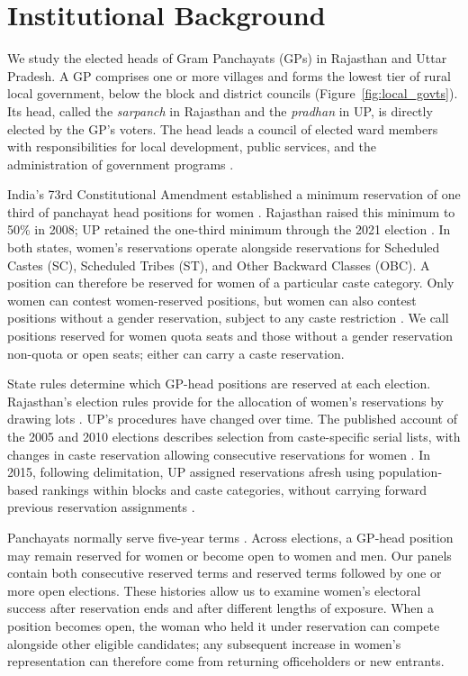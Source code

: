 \documentclass[11pt]{article}
\begin{document}
\section{Institutional Background}\label{sec:background}

We study the elected heads of Gram Panchayats (GPs) in Rajasthan and Uttar Pradesh. A GP comprises one or more villages and forms the lowest tier of rural local government, below the block and district councils (Figure~\ref{fig:local_govts}). Its head, called the \textit{sarpanch} in Rajasthan and the \textit{pradhan} in UP, is directly elected by the GP's voters. The head leads a council of elected ward members with responsibilities for local development, public services, and the administration of government programs \citep{rajasthan1994act, up1947act}.

India's 73rd Constitutional Amendment established a minimum reservation of one third of panchayat head positions for women \citep[Article 243D(4)]{indiaConstitution}. Rajasthan raised this minimum to 50\% in 2008; UP retained the one-third minimum through the 2021 election \citep{mopr2021reservation}. In both states, women's reservations operate alongside reservations for Scheduled Castes (SC), Scheduled Tribes (ST), and Other Backward Classes (OBC). A position can therefore be reserved for women of a particular caste category. Only women can contest women-reserved positions, but women can also contest positions without a gender reservation, subject to any caste restriction \citep{rajasthan1994act, up1947act}. We call positions reserved for women quota seats and those without a gender reservation non-quota or open seats; either can carry a caste reservation.

State rules determine which GP-head positions are reserved at each election. Rajasthan's election rules provide for the allocation of women's reservations by drawing lots \citep[Rule 9(3)]{rajasthan1994electionrules}. UP's procedures have changed over time. The published account of the 2005 and 2010 elections describes selection from caste-specific serial lists, with changes in caste reservation allowing consecutive reservations for women \citep[p.~206]{bose2018political}. In 2015, following delimitation, UP assigned reservations afresh using population-based rankings within blocks and caste categories, without carrying forward previous reservation assignments \citep[p.~760]{chaturvedi2025quotas}.

Panchayats normally serve five-year terms \citep[Article 243E]{indiaConstitution}. Across elections, a GP-head position may remain reserved for women or become open to women and men. Our panels contain both consecutive reserved terms and reserved terms followed by one or more open elections. These histories allow us to examine women's electoral success after reservation ends and after different lengths of exposure. When a position becomes open, the woman who held it under reservation can compete alongside other eligible candidates; any subsequent increase in women's representation can therefore come from returning officeholders or new entrants.
\end{document}
